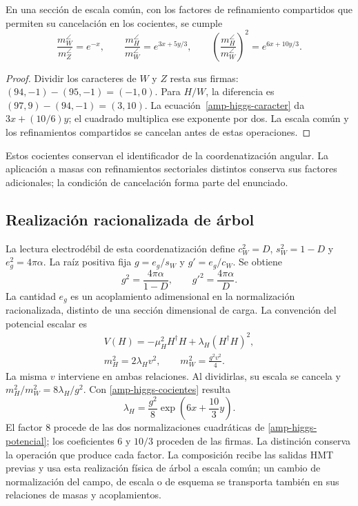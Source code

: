 \begin{proposition}
En una sección de escala común, con los factores de refinamiento compartidos
que permiten su cancelación en los cocientes, se cumple
\begin{equation}
 \frac{m_W^{\angle}}{m_Z^{\angle}}=e^{-x},\qquad
 \frac{m_H^{\angle}}{m_W^{\angle}}
 =e^{3x+5y/3},\qquad
 \left(\frac{m_H^{\angle}}{m_W^{\angle}}\right)^2
 =e^{6x+10y/3}.
 \label{amp-higgs-cocientes}
\end{equation}
\end{proposition}
\begin{proof}
Dividir los caracteres de $W$ y $Z$ resta sus firmas: $(94,-1)-(95,-1)=(-1,0)$.
Para $H/W$, la diferencia es $(97,9)-(94,-1)=(3,10)$.
La ecuación~\eqref{amp-higgs-caracter} da $3x+(10/6)y$; el cuadrado
multiplica ese exponente por dos. La escala común y los refinamientos
compartidos se cancelan antes de estas operaciones.
\end{proof}
Estos cocientes conservan el identificador de la coordenatización angular. La aplicación
a masas con refinamientos sectoriales distintos conserva sus factores
adicionales; la condición de cancelación forma parte del enunciado.

\subsection{Realización racionalizada de árbol}

La lectura electrodébil de esta coordenatización define
$c_W^2=D$, $s_W^2=1-D$ y $e_g^2=4\pi\alpha$. La raíz positiva fija
$g=e_g/s_W$ y $g'=e_g/c_W$. Se obtiene
\begin{equation}
 g^2=\frac{4\pi\alpha}{1-D},\qquad
 g'^2=\frac{4\pi\alpha}{D}.
 \label{amp-higgs-calibre}
\end{equation}
La cantidad $e_g$ es un acoplamiento adimensional en la normalización
racionalizada, distinto de una sección dimensional de carga.
La convención del potencial escalar es
\begin{equation}
 \begin{gathered}
 V(H)=-\mu_H^2H^\dagger H+\lambda_H(H^\dagger H)^2,\\
 m_H^2=2\lambda_Hv^2,\qquad m_W^2=\frac{g^2v^2}{4}.
 \end{gathered}
 \label{amp-higgs-potencial}
\end{equation}
La misma $v$ interviene en ambas relaciones. Al dividirlas, su escala se
cancela y $m_H^2/m_W^2=8\lambda_H/g^2$. Con
\eqref{amp-higgs-cocientes} resulta
\begin{equation}
 \boxed{\lambda_H=\frac{g^2}{8}\exp\!\left(6x+\frac{10}{3}y\right).}
 \label{amp-higgs-lambda}
\end{equation}
El factor $8$ procede de las dos normalizaciones cuadráticas de
\eqref{amp-higgs-potencial}; los coeficientes $6$ y $10/3$ proceden de
las firmas. La distinción conserva la operación que produce cada factor.
La composición recibe las salidas HMT previas y usa esta realización física
de árbol a escala común; un cambio de normalización del campo, de escala o
de esquema se transporta también en sus relaciones de masas y acoplamientos.

